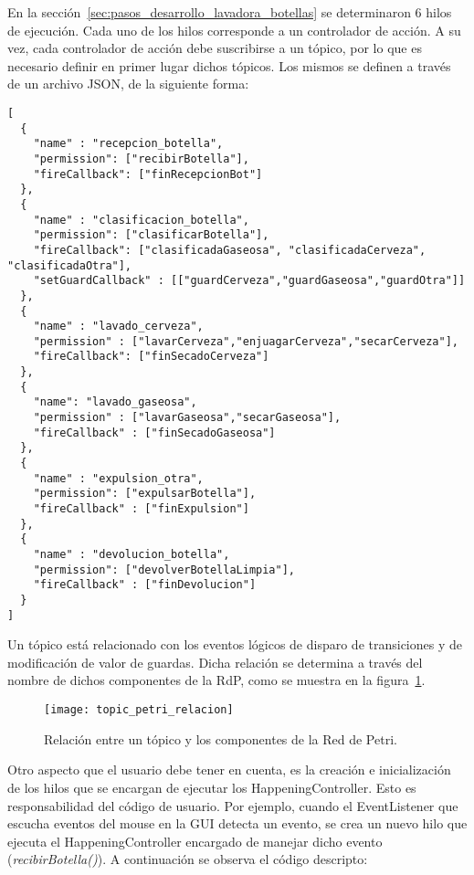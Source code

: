 En la sección~\ref{sec:pasos_desarrollo_lavadora_botellas} se determinaron 6
hilos de ejecución. Cada uno de los hilos corresponde a un controlador de
acción. A su vez, cada controlador de acción debe suscribirse a
un tópico, por lo que es necesario definir en primer lugar dichos tópicos. Los
mismos se definen a través de un archivo JSON, de la siguiente forma:\\
\begin{verbatim}
[
  {
    "name" : "recepcion_botella",
    "permission": ["recibirBotella"],
    "fireCallback": ["finRecepcionBot"]
  },
  {
    "name" : "clasificacion_botella",
    "permission": ["clasificarBotella"],
    "fireCallback": ["clasificadaGaseosa", "clasificadaCerveza", "clasificadaOtra"],
    "setGuardCallback" : [["guardCerveza","guardGaseosa","guardOtra"]]
  },
  {
    "name" : "lavado_cerveza",
    "permission" : ["lavarCerveza","enjuagarCerveza","secarCerveza"],
    "fireCallback": ["finSecadoCerveza"]
  },
  {
    "name": "lavado_gaseosa",
    "permission" : ["lavarGaseosa","secarGaseosa"],
    "fireCallback" : ["finSecadoGaseosa"]
  },
  {
    "name" : "expulsion_otra",
    "permission": ["expulsarBotella"],
    "fireCallback" : ["finExpulsion"]
  },
  {
    "name" : "devolucion_botella",
    "permission": ["devolverBotellaLimpia"],
    "fireCallback" : ["finDevolucion"]
  }
]
\end{verbatim}

Un tópico está relacionado con los eventos lógicos de
disparo de transiciones y de modificación de valor de guardas. Dicha relación
se determina a través del nombre de dichos componentes de la RdP, como
se muestra en la figura~\ref{fig:topic_petri_relacion}.

\begin{figure}[H]
    \centering
    \texttt{[image: topic\_petri\_relacion]}
    \caption{Relación entre un tópico y los componentes de la Red de Petri.}
    \label{fig:topic_petri_relacion}
\end{figure}

Otro aspecto que el usuario debe tener en cuenta, es la
creación e inicialización de los hilos que se encargan de ejecutar los
HappeningController. Esto es responsabilidad del código de usuario. Por
ejemplo, cuando el EventListener que escucha eventos del mouse en la GUI
detecta un evento, se crea un nuevo hilo que ejecuta el HappeningController
encargado de manejar dicho evento (\emph{recibirBotella()}). A
continuación se observa el código descripto:

